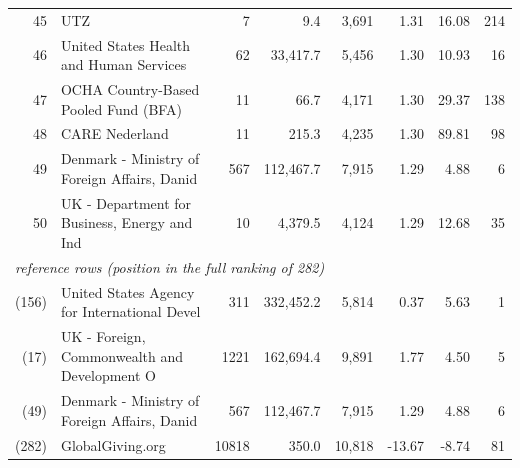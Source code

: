 \begin{tabular}{rlrrrrrr}
45 & UTZ & 7 & 9.4 & 3,691 & 1.31 & 16.08 & 214\\
46 & United States Health and Human Services & 62 & 33,417.7 & 5,456 & 1.30 & 10.93 & 16\\
47 & OCHA Country-Based Pooled Fund (BFA) & 11 & 66.7 & 4,171 & 1.30 & 29.37 & 138\\
48 & CARE Nederland & 11 & 215.3 & 4,235 & 1.30 & 89.81 & 98\\
49 & Denmark - Ministry of Foreign Affairs, Danid & 567 & 112,467.7 & 7,915 & 1.29 & 4.88 & 6\\
50 & UK - Department for Business, Energy and Ind & 10 & 4,379.5 & 4,124 & 1.29 & 12.68 & 35\\
\midrule
\multicolumn{8}{l}{\emph{reference rows (position in the full ranking of 282)}}\\
(156) & United States Agency for International Devel & 311 & 332,452.2 & 5,814 & 0.37 & 5.63 & 1\\
(17) & UK - Foreign, Commonwealth and Development O & 1221 & 162,694.4 & 9,891 & 1.77 & 4.50 & 5\\
(49) & Denmark - Ministry of Foreign Affairs, Danid & 567 & 112,467.7 & 7,915 & 1.29 & 4.88 & 6\\
(282) & GlobalGiving.org & 10818 & 350.0 & 10,818 & -13.67 & -8.74 & 81\\
\bottomrule
\end{tabular}
